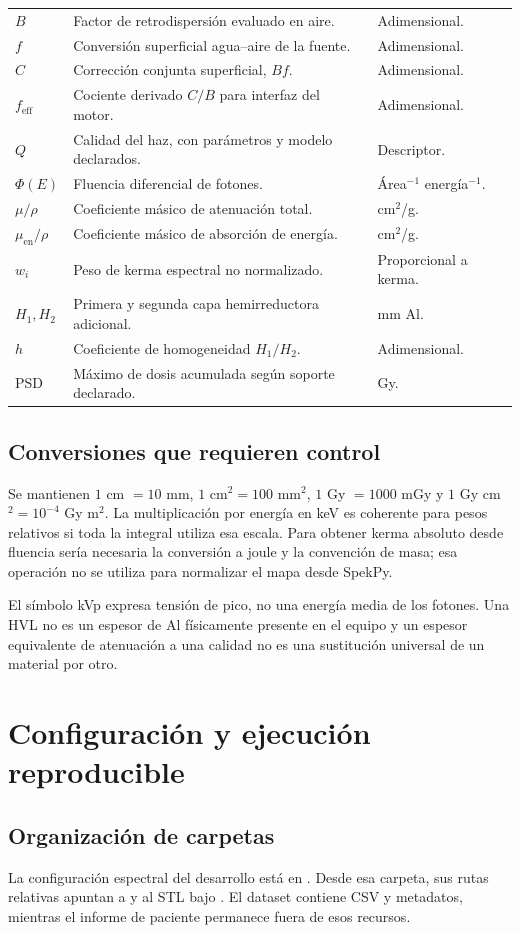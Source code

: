\begin{longtable}{p{27mm}p{80mm}p{29mm}}
$B$ & Factor de retrodispersión evaluado en aire. & Adimensional.\\
$f$ & Conversión superficial agua--aire de la fuente. & Adimensional.\\
$C$ & Corrección conjunta superficial, $Bf$. & Adimensional.\\
$f_{\mathrm{eff}}$ & Cociente derivado $C/B$ para interfaz del motor. & Adimensional.\\
$Q$ & Calidad del haz, con parámetros y modelo declarados. & Descriptor.\\
$\Phi(E)$ & Fluencia diferencial de fotones. & Área$^{-1}$ energía$^{-1}$.\\
$\mu/\rho$ & Coeficiente másico de atenuación total. & cm$^2$/g.\\
$\mu_{\mathrm{en}}/\rho$ & Coeficiente másico de absorción de energía. & cm$^2$/g.\\
$w_i$ & Peso de kerma espectral no normalizado. & Proporcional a kerma.\\
$H_1,H_2$ & Primera y segunda capa hemirreductora adicional. & mm Al.\\
$h$ & Coeficiente de homogeneidad $H_1/H_2$. & Adimensional.\\
PSD & Máximo de dosis acumulada según soporte declarado. & Gy.\\
\end{longtable}
\section{Conversiones que requieren control}
Se mantienen $1$ cm $=10$ mm, $1$ cm$^2=100$ mm$^2$, $1$ Gy $=1000$ mGy y $1$ Gy cm$^2=10^{-4}$ Gy m$^2$. La multiplicación por energía en keV es coherente para pesos relativos si toda la integral utiliza esa escala. Para obtener kerma absoluto desde fluencia sería necesaria la conversión a joule y la convención de masa; esa operación no se utiliza para normalizar el mapa desde SpekPy.

El símbolo kVp expresa tensión de pico, no una energía media de los fotones. Una HVL no es un espesor de Al físicamente presente en el equipo y un espesor equivalente de atenuación a una calidad no es una sustitución universal de un material por otro.

\chapter{Configuración y ejecución reproducible}
\section{Organización de carpetas}
La configuración espectral del desarrollo está en . Desde esa carpeta, sus rutas relativas apuntan a  y al STL bajo . El dataset contiene CSV y metadatos, mientras el informe de paciente permanece fuera de esos recursos.

